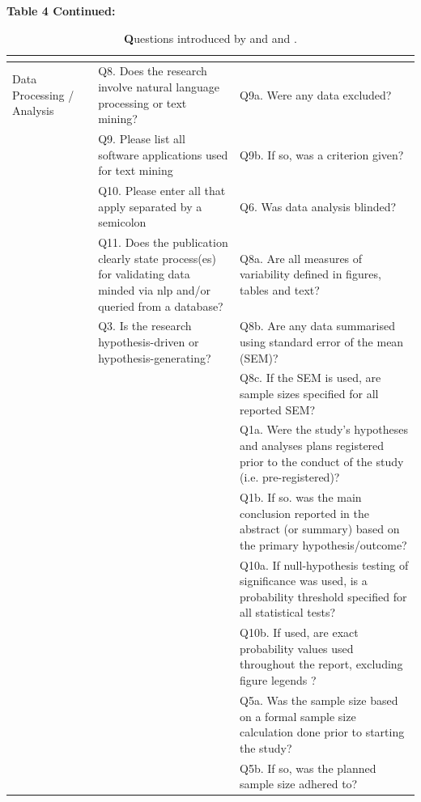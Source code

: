 \documentclass[12pt, a4paper, twocolumn]{article}
\begin{document}
\begin{table}[]
\begin{tabular}{>{\raggedright\arraybackslash}p{}>{\raggedright\arraybackslash}p{} >{\raggedright\arraybackslash}p{}>{\raggedright\arraybackslash}p{}}
\hline

	\end{tabular}
	\end{table}


	\begin{table}[]
	\centering
	\caption[]{\textbf Questions introduced by \citet{stagge2019assessing} and  \citet{mcintosh2017repeat} and \citet{QualityOutputChecklist}. }\label{tab:survey_table_3}{\textbf{Table 4 Continued:}}
	\begin{tabular}{>{\raggedright\arraybackslash}p{}>{\raggedright\arraybackslash}p{} >{\raggedright\arraybackslash}p{}>{\raggedright\arraybackslash}p{}}  
	\hline
&	\citet{stagge2019assessing}                                                                           & \citet{mcintosh2017repeat}        					 &\citet{QualityOutputChecklist}                   \\ 
\hline
Data Processing / Analysis
&&Q8. Does the research involve natural language processing or text mining?   &Q9a. Were any data excluded? 		\\
&&Q9. Please list all software applications used for text mining  &Q9b. If so, was a criterion given? \\
&&Q10. Please enter all that apply separated by a semicolon&Q6. Was data analysis blinded?\\
&&Q11. Does the publication clearly state process(es) for validating data minded via nlp and/or queried from a database?      &Q8a. Are all measures of variability defined in figures, tables and text?		 \\
&&Q3. Is the research hypothesis-driven or hypothesis-generating?           &Q8b. Are any data summarised using standard error of the mean (SEM)? 		\\
&&&Q8c. If the SEM is used, are sample sizes specified for all reported SEM?            \\
&&&Q1a. Were the study's hypotheses and analyses plans registered prior to the conduct of the study (i.e. pre-registered)?   \\
&&&Q1b. If so. was the main conclusion reported in the abstract (or summary) based on the primary hypothesis/outcome?     \\
&&&Q10a. If null-hypothesis testing of significance was used, is a probability threshold specified for all statistical tests?	\\
&&&Q10b. If used, are exact probability values used throughout the report, excluding figure legends ? \\
&&&Q5a. Was the sample size based on a formal sample size calculation done prior to starting the study? 	                      \\
&&&Q5b. If so, was the planned sample size adhered to?    \\	 
\hline
	\end{tabular}
	\end{table}
\end{document}
